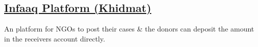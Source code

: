 \documentclass[]{m abbas resume' 2022}
\begin{document}
\begin{minipage}[t]{0.45\textwidth}
    \subsection{\href{https://github.com/smabbasht/Infaaq_app}{\textbf{Infaaq Platform (Khidmat)}}}
    An platform for NGOs to post their cases \& the donors can deposit the amount in the receivers account directly.
    
    
    
    
    
    
 





\end{minipage}
\end{document}
